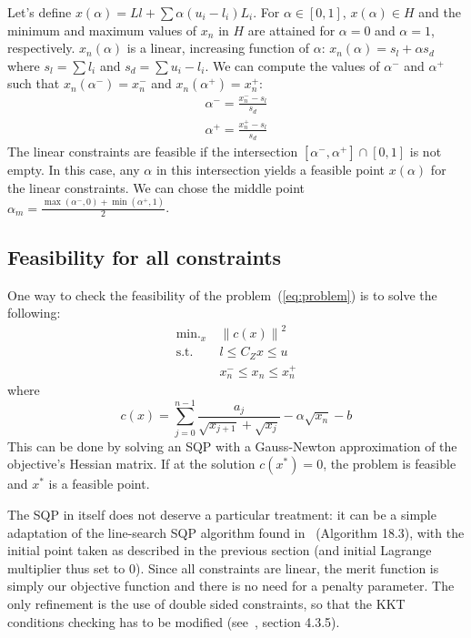 \documentclass[]{article}
\DeclareMathOperator*{\minimize}{\min.}
\newcommand{\st}{\mbox{s.t.}}
\begin{document}
Let's define $x(\alpha) = Ll + \sum \alpha (u_i-l_i) L_i$. For $\alpha \in \left[0,1\right]$, $x(\alpha) \in H$ and the minimum and maximum values of $x_n$ in $H$ are attained for $\alpha = 0$ and $\alpha = 1$, respectively. $x_n(\alpha)$ is a linear, increasing function of $\alpha$: $x_n(\alpha) = s_l + \alpha s_d$ where $s_l = \sum l_i$ and $s_d = \sum u_i-l_i$. \newline
We can compute the values of $\alpha^-$ and $\alpha^+$ such that $x_n(\alpha^-) = x_n^-$ and $x_n(\alpha^+) = x_n^+$:
\begin{align}
 \alpha^- = \frac{x_n^- - s_l}{s_d} \\
 \alpha^+ = \frac{x_n^+ - s_l}{s_d}
\end{align}
The linear constraints are feasible if the intersection $\left[\alpha^-, \alpha^+\right] \cap \left[0,1\right]$ is not empty. In this case, any $\alpha$ in this intersection yields a feasible point $x(\alpha)$ for the linear constraints. We can chose the middle point $\alpha_m = \frac{\max(\alpha^-,0) + \min(\alpha^+,1)}{2}$.

\subsection{Feasibility for all constraints}
One way to check the feasibility of the problem~(\ref{eq:problem}) is to solve the following:
\begin{align}
  \minimize_x\ & \left\|c(x)\right\|^2 \\
  \st\ & l \leq C_Z x \leq u\\
       & x_n^- \leq x_n \leq x_n^+
\end{align}
where
\begin{equation}
  c(x) = \sum_{j=0}^{n-1} \frac{a_j}{\sqrt{x_{j+1}} + \sqrt{x_j}} - \alpha
    \sqrt{x_n} - b
\end{equation}
This can be done by solving an SQP with a Gauss-Newton approximation of the objective's Hessian matrix. If at the solution $c(x^*) = 0$, the problem is feasible and $x^*$ is a feasible point.

The SQP in itself does not deserve a particular treatment: it can be a simple adaptation of the line-search SQP algorithm found in~\cite{nocedal:book:2006} (Algorithm 18.3), with the initial point taken as described in the previous section (and initial Lagrange multiplier thus set to $0$). Since all constraints are linear, the merit function is simply our objective function and there is no need for a penalty parameter. The only refinement is the use of double sided constraints, so that the KKT conditions checking has to be modified (see~\cite{brossette:phd:2016}, section 4.3.5).
\end{document}
